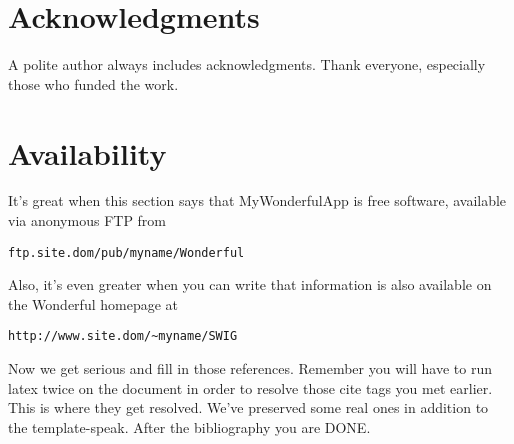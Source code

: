 \documentclass[letterpaper,twocolumn,10pt]{article}
\begin{document}
\section{Acknowledgments}

A polite author always includes acknowledgments.  Thank everyone,
especially those who funded the work. 

\section{Availability}

It's great when this section says that MyWonderfulApp is free software, 
available via anonymous FTP from

\begin{center}
{\tt ftp.site.dom/pub/myname/Wonderful}\\
\end{center}

Also, it's even greater when you can write that information is also 
available on the Wonderful homepage at 

\begin{center}
{\tt http://www.site.dom/\~{}myname/SWIG}
\end{center}

Now we get serious and fill in those references.  Remember you will
have to run latex twice on the document in order to resolve those
cite tags you met earlier.  This is where they get resolved.
We've preserved some real ones in addition to the template-speak.
After the bibliography you are DONE.

{\footnotesize 
}
\end{document}
